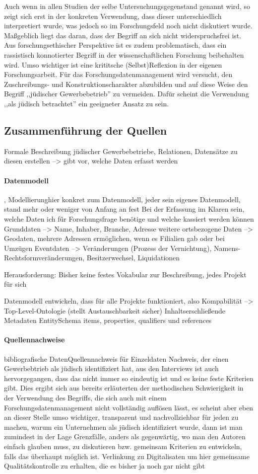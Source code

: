 Auch wenn in allen Studien der selbe Untersuchungsgegenstand genannt wird, so zeigt sich erst in der konkreten Verwendung, dass dieser unterschiedlich interpretiert wurde, was jedoch so im Forschungsfeld noch nicht diskutiert wurde. Maßgeblich liegt das daran, dass der Begriff an sich nicht widerspruchsfrei ist. Aus forschungsethischer Perspektive ist es zudem problematisch, dass ein rassistisch konnotierter Begriff in der wissenschaftlichen Forschung beibehalten wird. Umso wichtiger ist eine krititsche (Selbst)Reflexion in der eigenen Forschungsarbeit. Für das Forschungsdatenmanagement wird versucht, den Zuschreibungs- und Konstruktionscharakter abzubilden und auf diese Weise den Begriff ,,jüdischer Gewerbebetrieb'' zu vermeiden. Dafür scheint die Verwendung ,,als jüdisch betrachtet'' ein geeigneter Ansatz zu sein.

\subsection{Zusammenführung der Quellen}
Formale Beschreibung jüdischer Gewerbebetriebe, Relationen, Datensätze zu diesen erstellen --> gibt vor, welche Daten erfasst werden 
\paragraph{Datenmodell}, Modellierunghier konkret zum Datenmodell, jeder sein eigenes Datenmodell, stand mehr oder weniger von Anfang an fest
Bei der Erfassung im Klaren sein, welche Daten ich für Forschungsfrage benötige und welche kassiert werden können
Grunddaten --> Name, Inhaber, Branche, Adresse
weitere ortsbezogene Daten --> Geodaten, mehrere Adressen ermöglichen, wenn es Filialien gab oder bei Umzügen
Eventdaten --> Veränderungen (Prozess der Vernichtung), Namens-Rechtsformveränderungen, Besitzerwechsel, Liquidationen

Herausforderung: Bisher keine festes Vokabular zur Beschreibung, jedes Projekt für sich 

Datenmodell entwickeln, dass für alle Projekte funktioniert, also 
Kompabilität --> Top-Level-Ontologie (stellt Austauschbarkeit sicher)
Inhaltserschließende Metadaten
EntitySchema items, properties, qualifiers und references
\paragraph{Quellennachweise}
bibliografische DatenQuellennachweis für Einzeldaten
Nachweis, der einen Gewerbebtrieb als jüdisch identifiziert hat, aus den Interviews ist auch hervorgegangen, dass das nicht immer so eindeutig ist und es keine feste Kriterien gibt. Dies ergibt sich aus bereits erläuterten der methodischen Schwierigkeit in der Verwendung des Begriffs, die sich auch mit einem Forschungsdatenmanagement nicht vollständig auflösen lässt, es scheint aber eben an dieser Stelle umso wichtiger, transparent und nachvollziehbar für jeden zu machen, warum ein Unternehmen als jüdisch identifiziert wurde, dann ist man zumindest in der Lage Grenzfälle, anders als gegenwärtig, wo man den Autoren einfach glauben muss, zu diskutieren bzw. gemeinsam Kriterien zu entwickeln, falls das überhaupt möglich ist.
Verlinkung zu Digitalisaten um hier gemeinsame Qualitätskontrolle zu erhalten, die es bisher ja noch gar nicht gibt
